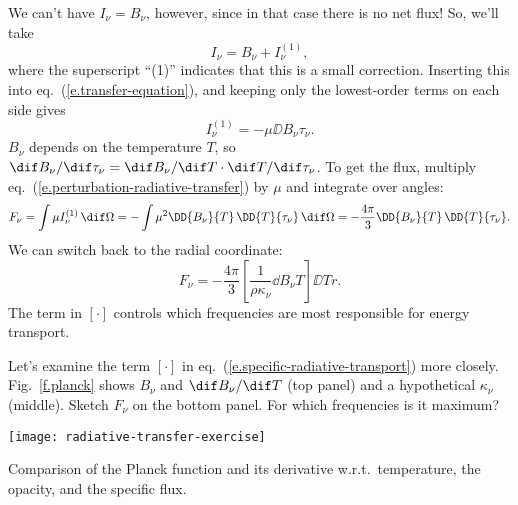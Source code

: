 We can't have $I_{\nu} = B_{\nu}$, however, since in that case there is no net flux! So, we'll take
\[ I_{\nu} = B_{\nu} + I_{\nu}^{(1)}, \]
where the superscript ``(1)'' indicates that this is a small correction. Inserting this into eq.~(\ref{e.transfer-equation}), and keeping only the lowest-order terms on each side gives
\begin{equation}\label{e.perturbation-radiative-transfer}
I_{\nu}^{(1)} = -\mu\DD{B_{\nu}}{\tau_{\nu}}.
\end{equation}
$B_{\nu}$ depends on the temperature $T$, so $\dif B_{\nu}/\dif\tau_{\nu} = \dif B_{\nu}/\dif T \cdot \dif T/\dif \tau_{\nu}$. To get the flux, multiply eq.~(\ref{e.perturbation-radiative-transfer}) by $\mu$ and integrate over angles:
\[ F_{\nu} = \int\mu I_{\nu}^{(1)}\,\dif\Omega = -\int \mu^{2}\DD{B_{\nu}}{T}\,\DD{T}{\tau_{\nu}}\,\dif \Omega = -\frac{4\pi}{3} \DD{B_{\nu}}{T}\,\DD{T}{\tau_{\nu}}. \]
We can switch back to the radial coordinate:
\begin{equation}\label{e.specific-radiative-transport}
	F_{\nu} = -\frac{4\pi}{3}\left[\frac{1}{\rho\kappa_{\nu}}\dd{B_{\nu}}{T}\right]\DD{T}{r}.
\end{equation}
The term in $\left[\cdot\right]$ controls which frequencies are most responsible for energy transport.

\begin{exercisebox}
\label{ex.radiative-transfer}
Let's examine the term $\left[\cdot\right]$ in eq.~(\ref{e.specific-radiative-transport}) more closely. Fig.~\ref{f.planck} shows $B_{\nu}$ and $\dif B_{\nu}/\dif T$ (top panel) and a hypothetical $\kappa_{\nu}$ (middle). Sketch $F_{\nu}$ on the bottom panel.  For which frequencies is it maximum?
\end{exercisebox}

\begin{marginfigure}
\texttt{[image: radiative-transfer-exercise]}
\caption{\label{f.planck} Comparison of the Planck function and its derivative w.r.t.\ temperature, the opacity, and the specific flux.}
\end{marginfigure}

